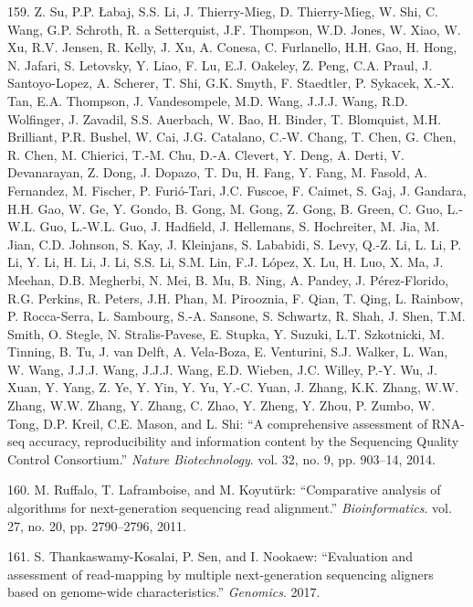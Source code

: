 \documentclass[12pt,a4paper,twoside]{ugathesis}
\theoremstyle{definition}
\theoremstyle{definition}
\theoremstyle{definition}
\theoremstyle{remark}
\begin{document}
\hypertarget{ref-Su2014}{}
159. Z. Su, P.P. Łabaj, S.S. Li, J. Thierry-Mieg, D. Thierry-Mieg, W.
Shi, C. Wang, G.P. Schroth, R. a Setterquist, J.F. Thompson, W.D. Jones,
W. Xiao, W. Xu, R.V. Jensen, R. Kelly, J. Xu, A. Conesa, C. Furlanello,
H.H. Gao, H. Hong, N. Jafari, S. Letovsky, Y. Liao, F. Lu, E.J. Oakeley,
Z. Peng, C.A. Praul, J. Santoyo-Lopez, A. Scherer, T. Shi, G.K. Smyth,
F. Staedtler, P. Sykacek, X.-X. Tan, E.A. Thompson, J. Vandesompele,
M.D. Wang, J.J.J. Wang, R.D. Wolfinger, J. Zavadil, S.S. Auerbach, W.
Bao, H. Binder, T. Blomquist, M.H. Brilliant, P.R. Bushel, W. Cai, J.G.
Catalano, C.-W. Chang, T. Chen, G. Chen, R. Chen, M. Chierici, T.-M.
Chu, D.-A. Clevert, Y. Deng, A. Derti, V. Devanarayan, Z. Dong, J.
Dopazo, T. Du, H. Fang, Y. Fang, M. Fasold, A. Fernandez, M. Fischer, P.
Furió-Tari, J.C. Fuscoe, F. Caimet, S. Gaj, J. Gandara, H.H. Gao, W. Ge,
Y. Gondo, B. Gong, M. Gong, Z. Gong, B. Green, C. Guo, L.-W.L. Guo,
L.-W.L. Guo, J. Hadfield, J. Hellemans, S. Hochreiter, M. Jia, M. Jian,
C.D. Johnson, S. Kay, J. Kleinjans, S. Lababidi, S. Levy, Q.-Z. Li, L.
Li, P. Li, Y. Li, H. Li, J. Li, S.S. Li, S.M. Lin, F.J. López, X. Lu, H.
Luo, X. Ma, J. Meehan, D.B. Megherbi, N. Mei, B. Mu, B. Ning, A. Pandey,
J. Pérez-Florido, R.G. Perkins, R. Peters, J.H. Phan, M. Pirooznia, F.
Qian, T. Qing, L. Rainbow, P. Rocca-Serra, L. Sambourg, S.-A. Sansone,
S. Schwartz, R. Shah, J. Shen, T.M. Smith, O. Stegle, N. Stralis-Pavese,
E. Stupka, Y. Suzuki, L.T. Szkotnicki, M. Tinning, B. Tu, J. van Delft,
A. Vela-Boza, E. Venturini, S.J. Walker, L. Wan, W. Wang, J.J.J. Wang,
J.J.J. Wang, E.D. Wieben, J.C. Willey, P.-Y. Wu, J. Xuan, Y. Yang, Z.
Ye, Y. Yin, Y. Yu, Y.-C. Yuan, J. Zhang, K.K. Zhang, W.W. Zhang, W.W.
Zhang, Y. Zhang, C. Zhao, Y. Zheng, Y. Zhou, P. Zumbo, W. Tong, D.P.
Kreil, C.E. Mason, and L. Shi: ``A comprehensive assessment of RNA-seq
accuracy, reproducibility and information content by the Sequencing
Quality Control Consortium.'' \emph{Nature Biotechnology}. vol. 32, no.
9, pp. 903--14, 2014.

\hypertarget{ref-Ruffalo2011}{}
160. M. Ruffalo, T. Laframboise, and M. Koyutürk: ``Comparative analysis
of algorithms for next-generation sequencing read alignment.''
\emph{Bioinformatics}. vol. 27, no. 20, pp. 2790--2796, 2011.

\hypertarget{ref-Thankaswamy-Kosalai2017}{}
161. S. Thankaswamy-Kosalai, P. Sen, and I. Nookaew: ``Evaluation and
assessment of read-mapping by multiple next-generation sequencing
aligners based on genome-wide characteristics.'' \emph{Genomics}. 2017.
\end{document}
